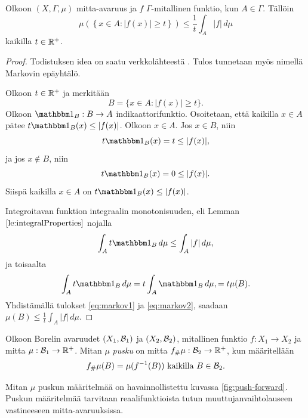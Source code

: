 \documentclass[12pt,oneside,a4paper]{amsbook} %
\begin{document}
\begin{theorem}\label{thm:markov}
    Olkoon $(X, \Gamma, \mu)$ mitta-avaruus ja $f$ $\Gamma$-mitallinen funktio, kun $A \in \Gamma$. Tällöin
    \begin{equation*}
        \mu(\left\{x \in A : |f(x)| \ge t\right\}) \le \frac{1}{t}\int_A |f| \, d\mu
    \end{equation*}
    kaikilla $t\in {\mathbb{R}^{+}}$.
\end{theorem}
\begin{proof}
    Todistuksen idea on saatu verkkolähteestä \cite{markov}. Tulos tunnetaan myös nimellä Markovin epäyhtälö.
    
    Olkoon $t \in {\mathbb{R}^{+}}$ ja merkitään
    \begin{equation*}
        B = \{x \in A : |f(x)| \ge t\}.
    \end{equation*}
    Olkoon $\indfct{B}: B \to A$ indikaattorifunktio. Osoitetaan, että kaikilla $x\in A$ pätee $t\indfct{B}(x) \le |f(x)|$. Olkoon $x \in A$. Jos $x \in B$, niin 
    \begin{equation*}
        t\indfct B (x) = t \le |f(x)|,
    \end{equation*}
    ja jos $x \notin B$, niin
    \begin{equation*}
        t\indfct B (x) = 0 \le |f(x)|.
    \end{equation*}
    Siispä kaikilla $x\in A$ on $t\indfct{B}(x) \le |f(x)|$.
    
    Integroitavan funktion integraalin monotonisuuden, eli Lemman $\ref{le:integralProperties}$ nojalla
    \begin{equation}\label{eq:markov1}
        \int_A t\indfct{B} \, d\mu \le \int_A |f| \, d\mu,
    \end{equation}
    ja toisaalta
    \begin{equation}\label{eq:markov2}
        \int_A t\indfct{B} \, d\mu = t\int_A \indfct{B} \, d\mu, = t\mu(B).
    \end{equation}
    Yhdistämällä tulokset \eqref{eq:markov1} ja \eqref{eq:markov2}, saadaan
        $\mu(B) \le \frac{1}{t}\int_A |f| \, d\mu.$
\end{proof}

\begin{definition}
    Olkoon Borelin avaruudet $(X_1, \mathcal{B}_1)$ ja $(X_2, \mathcal{B}_2)$, mitallinen funktio $f:X_1 \to X_2$ ja mitta $\mu: \mathcal{B}_1 \to \mathbb{R}^+$. Mitan $\mu$ \textit{pusku} on mitta $f_\#\mu: \mathcal{B}_2 \to \mathbb{R}^+$, kun määritellään
    $$f_\# \mu (B) = \mu(f^{-1}(B)) \text{ kaikilla } B\in \mathcal{B}_2.$$
\end{definition}
Mitan $\mu$ puskun määritelmää on havainnollistettu kuvassa \ref{fig:push-forward}. Puskun määritelmää tarvitaan reaalifunktioista tutun muuttujanvaihtolauseen vastineeseen mitta-avaruuksissa.
\end{document}
